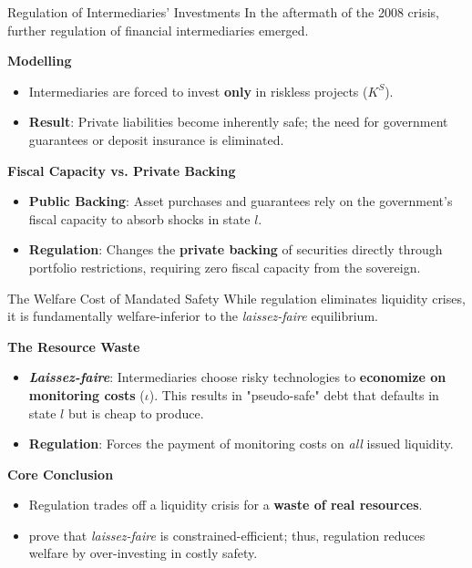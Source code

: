 \documentclass[11pt,aspectratio=169]{beamer}
\begin{document}
\begin{frame}{Regulation of Intermediaries' Investments}
\small
In the aftermath of the 2008 crisis, further regulation of financial intermediaries emerged.

\vspace{0.3cm}
\textbf{Modelling}
\begin{itemize}
    \item Intermediaries are forced to invest \textbf{only} in riskless projects ($K^S$).
    \item \textbf{Result}: Private liabilities become inherently safe; the need for government guarantees or deposit insurance is eliminated.
\end{itemize}

\vspace{0.3cm}
\textbf{Fiscal Capacity vs. Private Backing}
\begin{itemize}
    \item \textbf{Public Backing}: Asset purchases and guarantees rely on the government's fiscal capacity to absorb shocks in state $l$.
    \item \textbf{Regulation}: Changes the \textbf{private backing} of securities directly through portfolio restrictions, requiring zero fiscal capacity from the sovereign.
\end{itemize}
\end{frame}

\begin{frame}{The Welfare Cost of Mandated Safety}
\small
While regulation eliminates liquidity crises, it is fundamentally welfare-inferior to the \textit{laissez-faire} equilibrium.

\vspace{0.3cm}
\textbf{The Resource Waste}
\begin{itemize}
    \item \textbf{\textit{Laissez-faire}}: Intermediaries choose risky technologies to \textbf{economize on monitoring costs} ($\iota$). This results in "pseudo-safe" debt that defaults in state $l$ but is cheap to produce.
    \item \textbf{Regulation}: Forces the payment of monitoring costs on \textit{all} issued liquidity.
\end{itemize}

\vspace{0.3cm}
\textbf{Core Conclusion}
\begin{itemize}
    \item Regulation trades off a liquidity crisis for a \textbf{waste of real resources}.
    \item \textcite{benigno2019} prove that \textit{laissez-faire} is constrained-efficient; thus, regulation reduces welfare by over-investing in costly safety.
\end{itemize}
\end{frame}
\end{document}
